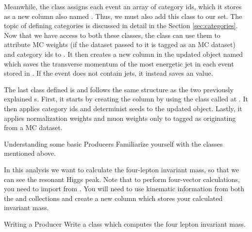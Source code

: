 Meanwhile, the  class assigns each event an array of category ids, which it stores as a new column also named . Thus, we must also add this class to our  set. The topic of defining categories is discussed in detail in the Section \ref{sec:categories}. Now that we have access to both these  classes, the  class can use them to attribute MC weights (if the dataset passed to it is tagged as an MC dataset) and category ids to . It then creates a new column in the updated  object named  which saves the transverse momentum of the most energetic jet in each event stored in . If the event does not contain jets, it instead saves an  value. 

The last  class defined is  and follows the same structure as the  two previously explained s. First, it starts by creating the  column by using the  class  called at . It then applies category ids and determinist seeds to the updated  object. Lastly, it applies normalization weights and muon weights only to  tagged as originating from a MC dataset. 

\begin{exercise}{Understanding some basic Producers}
	Familiarize yourself with the  classes mentioned above.
\end{exercise}

In this  analysis we want to calculate the four-lepton invariant mass, so that we can see the resonant Higgs peak. Note that to perform four-vector calculations, you need to import  from . You will need to use kinematic information from both the  and  collections and create a new column which stores your calculated invariant mass.

\begin{exercise}{Writing a Producer}{}
	Write a  class which computes the four lepton invariant mass. 
\end{exercise}
 
